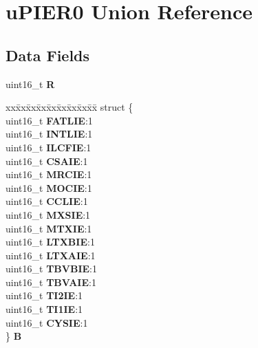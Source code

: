 \hypertarget{unionuPIER0}{}\section{u\+P\+I\+E\+R0 Union Reference}
\label{unionuPIER0}
\subsection*{Data Fields}
\begin{DoxyCompactItemize}
\item 
\mbox{\label{unionuPIER0_a1213f46c5268667967cd6b8279a6126b}} 
uint16\+\_\+t {\bfseries R}
\item 
\mbox{\label{unionuPIER0_abab99b1addebbf6cbde00ee44f9b04d9}} 
\begin{tabbing}
xx\=xx\=xx\=xx\=xx\=xx\=xx\=xx\=xx\=\kill
struct \{\\
\>uint16\_t {\bfseries FATLIE}:1\\
\>uint16\_t {\bfseries INTLIE}:1\\
\>uint16\_t {\bfseries ILCFIE}:1\\
\>uint16\_t {\bfseries CSAIE}:1\\
\>uint16\_t {\bfseries MRCIE}:1\\
\>uint16\_t {\bfseries MOCIE}:1\\
\>uint16\_t {\bfseries CCLIE}:1\\
\>uint16\_t {\bfseries MXSIE}:1\\
\>uint16\_t {\bfseries MTXIE}:1\\
\>uint16\_t {\bfseries LTXBIE}:1\\
\>uint16\_t {\bfseries LTXAIE}:1\\
\>uint16\_t {\bfseries TBVBIE}:1\\
\>uint16\_t {\bfseries TBVAIE}:1\\
\>uint16\_t {\bfseries TI2IE}:1\\
\>uint16\_t {\bfseries TI1IE}:1\\
\>uint16\_t {\bfseries CYSIE}:1\\
\} {\bfseries B}\\


\end{tabbing}
\end{DoxyCompactItemize}
